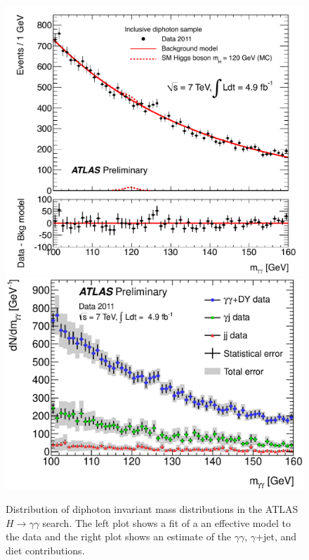 \documentclass{cernrep}
\begin{document}
\begin{figure}[htbp]
\begin{center}
\includegraphics[width=.4\textwidth]{H_2ph}
\includegraphics[width=.5\textwidth]{H_2ph_contributions}
\caption{Distribution of diphoton invariant mass distributions in the ATLAS $H\to\gamma\gamma$ search.  The left plot shows a fit of a an effective model to the data and the right plot shows an estimate of the $\gamma\gamma$, $\gamma$+jet, and diet contributions.}
\label{fig:H2photons}
\end{center}
\end{figure}
\end{document}
